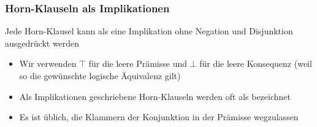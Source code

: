 \documentclass[aspectratio=1610,onlymath]{beamer}
\begin{document}
\begin{frame}\frametitle{Horn-Klauseln als Implikationen}

Jede Horn-Klausel kann als eine Implikation ohne Negation und Disjunktion ausgedrückt werden
\bigskip


\begin{itemize}
\item Wir verwenden $\top$ für die leere Prämisse und $\bot$ für die leere Konsequenz (weil so die gewünschte logische Äquivalenz gilt)
\item Als Implikationen geschriebene Horn-Klauseln werden oft als  bezeichnet
\item Es ist üblich, die Klammern der Konjunktion in der Prämisse wegzulassen
\end{itemize}

\end{frame}

% 
% 
\end{document}
